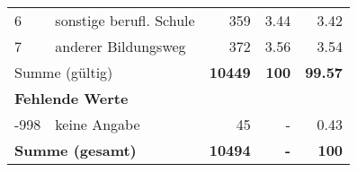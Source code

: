 \begin{longtable}{lXrrr}
     6 &
     \multicolumn{1}{X}{ sonstige berufl. Schule   } &


       \num{359} &
       \num[round-mode=places,round-precision=2]{3,44} &
         \num[round-mode=places,round-precision=2]{3,42} \\

     7 &
     \multicolumn{1}{X}{ anderer Bildungsweg   } &


       \num{372} &
       \num[round-mode=places,round-precision=2]{3,56} &
         \num[round-mode=places,round-precision=2]{3,54} \\
     \midrule
     \multicolumn{2}{l}{Summe (gültig)} &
       \textbf{\num{10449}} &
     \textbf{100} &
       \textbf{\num[round-mode=places,round-precision=2]{99,57}} \\
     \multicolumn{5}{l}{\textbf{Fehlende Werte}}\\
       -998 &
       keine Angabe &
         \num{45} &
        - &
         \num[round-mode=places,round-precision=2]{0,43} \\
     \midrule
     \multicolumn{2}{l}{\textbf{Summe (gesamt)}} &
          \textbf{\num{10494}} &
        \textbf{-} &
        \textbf{100} \\
     \bottomrule
     \end{longtable}
     
